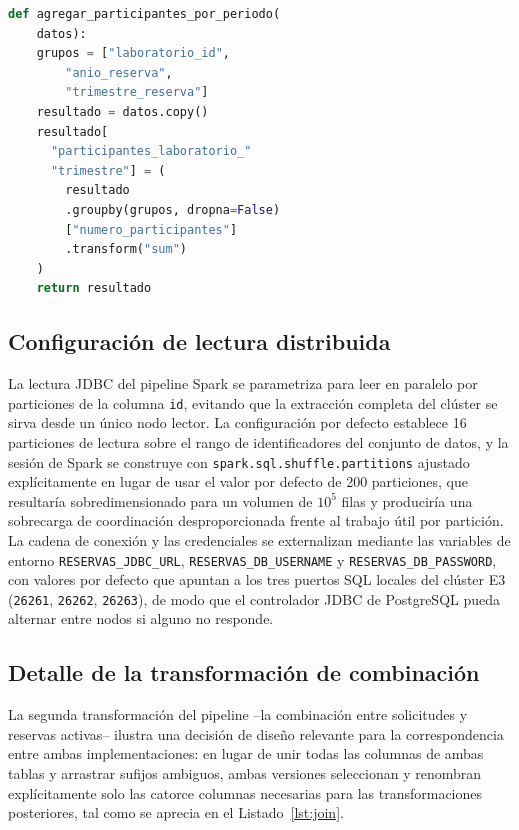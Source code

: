 \documentclass[10pt,twocolumn]{article}
\begin{document}
\begin{lstlisting}[language=Python,caption={Agregación por ventana equivalente en la línea base pandas (\texttt{spark/baseline.py}).},label={lst:baseline}]
def agregar_participantes_por_periodo(
    datos):
    grupos = ["laboratorio_id",
        "anio_reserva",
        "trimestre_reserva"]
    resultado = datos.copy()
    resultado[
      "participantes_laboratorio_"
      "trimestre"] = (
        resultado
        .groupby(grupos, dropna=False)
        ["numero_participantes"]
        .transform("sum")
    )
    return resultado
\end{lstlisting}

\subsection{Configuración de lectura distribuida}

La lectura JDBC del pipeline Spark se parametriza para leer en paralelo por
particiones de la columna \texttt{id}, evitando que la extracción completa
del clúster se sirva desde un único nodo lector. La configuración por
defecto establece 16 particiones de lectura sobre el rango de
identificadores del conjunto de datos, y la sesión de Spark se construye
con \texttt{spark.sql.shuffle.partitions} ajustado explícitamente en lugar
de usar el valor por defecto de 200 particiones, que resultaría
sobredimensionado para un volumen de $10^5$ filas y produciría una sobrecarga
de coordinación desproporcionada frente al trabajo útil por partición. La
cadena de conexión y las credenciales se externalizan mediante las
variables de entorno \texttt{RESERVAS\_JDBC\_URL},
\texttt{RESERVAS\_DB\_USERNAME} y \texttt{RESERVAS\_DB\_PASSWORD}, con
valores por defecto que apuntan a los tres puertos SQL locales del clúster
E3 (\texttt{26261}, \texttt{26262}, \texttt{26263}), de modo que el
controlador JDBC de PostgreSQL pueda alternar entre nodos si alguno no
responde.

\subsection{Detalle de la transformación de combinación}

La segunda transformación del pipeline --la combinación entre solicitudes
y reservas activas-- ilustra una decisión de diseño relevante para la
correspondencia entre ambas implementaciones: en lugar de unir todas las
columnas de ambas tablas y arrastrar sufijos ambiguos, ambas versiones
seleccionan y renombran explícitamente solo las catorce columnas
necesarias para las transformaciones posteriores, tal como se aprecia en el
Listado~\ref{lst:join}.
\end{document}
